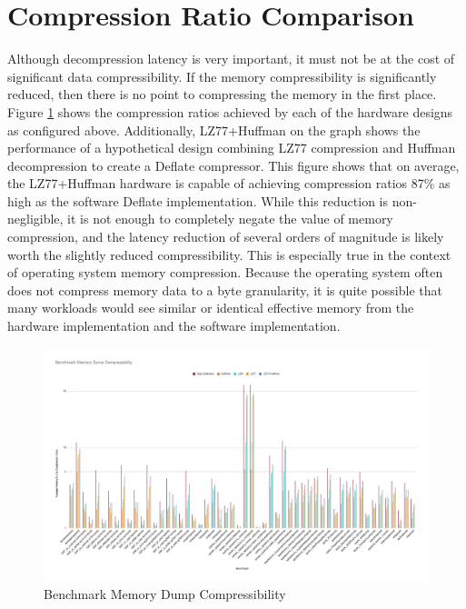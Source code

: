 \documentclass[doublespace,nopageskip]{VTthesis}
\begin{document}
\section{Compression Ratio Comparison}\label{se:compression_ratio_comparison_results}
Although decompression latency is very important, it must not be at the cost of significant data compressibility. If the memory compressibility is significantly reduced, then there is no point to compressing the memory in the first place. Figure \ref{fig:benchmark_memory_dump_compressibility} shows the compression ratios achieved by each of the hardware designs as configured above. Additionally, LZ77+Huffman on the graph shows the performance of a hypothetical design combining LZ77 compression and Huffman decompression to create a Deflate compressor. This figure shows that on average, the LZ77+Huffman hardware is capable of achieving compression ratios 87\% as high as the software Deflate implementation. While this reduction is non-negligible, it is not enough to completely negate the value of memory compression, and the latency reduction of several orders of magnitude is likely worth the slightly reduced compressibility. This is especially true in the context of operating system memory compression. Because the operating system often does not compress memory data to a byte granularity, it is quite possible that many workloads would see similar or identical effective memory from the hardware implementation and the software implementation.

\begin{figure}[htb]
	\centering
	\includegraphics[scale=0.24]{Benchmark Memory Dump Compressibility.png}
	\caption{Benchmark Memory Dump Compressibility}
	\label{fig:benchmark_memory_dump_compressibility}
\end{figure}
\end{document}
